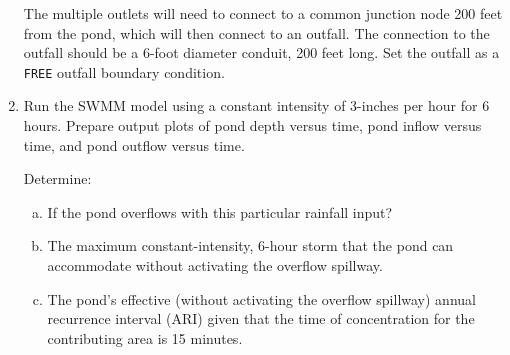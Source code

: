 \documentclass[12pt]{article}
\begin{document}
\begin{enumerate}
The multiple outlets will need to connect to a common junction node 200 feet from the pond, which will then connect to an outfall.  The connection to the outfall should be a 6-foot diameter conduit, 200 feet long.   Set the outfall as a \texttt{FREE} outfall boundary condition.
\item Run the SWMM model using a constant intensity of 3-inches per hour for 6 hours.  Prepare output plots of pond depth versus time, pond inflow versus time, and pond outflow versus time.

Determine:
\begin{enumerate}[a)]
\item If the pond overflows with this particular rainfall input?
\item The maximum constant-intensity, 6-hour storm that the pond can accommodate without activating the overflow spillway.
\item The pond's effective (without activating the overflow spillway) annual recurrence interval (ARI) given that the time of concentration for the contributing area is 15 minutes.  
\end{enumerate}


\end{enumerate}
\end{document}
